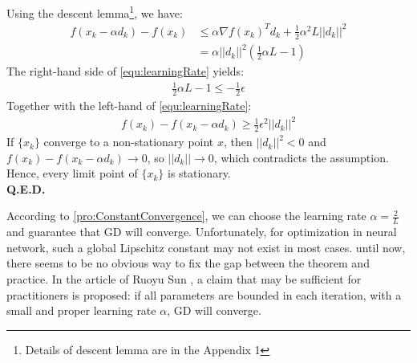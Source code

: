 \begin{prf}
    Using the descent lemma\footnote{Details of descent lemma are in the 
    Appendix 1 }, we have:
    \begin{align}
        f(x_k - \alpha d_k) - f(x_k)&\leq\alpha\nabla f(x_k)^Td_k + \frac{1}{2}\alpha^2L||d_k||^2 \\
        & = \alpha ||d_k||^2(\frac{1}{2}\alpha L - 1)
    \end{align}
    The right-hand side of \autoref{equ:learningRate} yields:
    \begin{align}
        \frac{1}{2}\alpha L - 1 \leq -\frac{1}{2}\epsilon
    \end{align}
    Together with the left-hand of \autoref{equ:learningRate}:
    \begin{align}
        f(x_k) - f(x_k - \alpha d_k) \geq \frac{1}{2}\epsilon^2||d_k||^2
    \end{align}
    If $ \{x_k\} $ converge to a non-stationary point $ x $, then $ ||d_k||^2 < 0 $ 
    and $ f(x_k) - f(x_k - \alpha d_k) \rightarrow 0 $, 
    so $ ||d_k|| \rightarrow 0 $, which contradicts the assumption. Hence,
    every limit point of $ \{x_k\} $ is stationary.  \\
    \textbf{Q.E.D.}
\end{prf}

\par According to \autoref{pro:ConstantConvergence}, we can choose the 
learning rate $ \alpha = \frac{2}{L} $ and guarantee that GD will converge.
Unfortunately, for optimization in neural network, such a global Lipschitz 
constant may not exist in most cases. until now, there seems to be no obvious
way to fix the gap between the theorem and practice. In the article of Ruoyu Sun
\parencite{sun2019optimization}, a claim that may be sufficient for practitioners
is proposed: if all parameters are bounded in each iteration, with 
a small and proper learning rate $ \alpha $, GD will converge.



